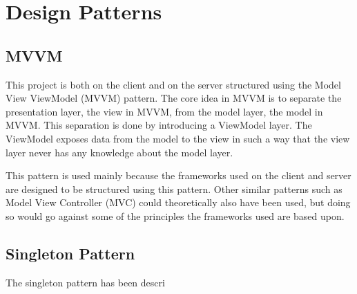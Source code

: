 \chapter{Design Patterns}

\section{MVVM}

This project is both on the client and on the server structured using
the Model View ViewModel (MVVM) pattern. The core idea in MVVM is to separate
the presentation layer, the view in MVVM, from the model layer, the
model in MVVM. This separation is done by introducing a ViewModel
layer. The ViewModel exposes data from the model to the view in such a
way that the view layer never has any knowledge about the model layer.

This pattern is used mainly because the frameworks used on the client
and server are designed to be structured using this pattern. Other
similar patterns such as Model View Controller (MVC) could
theoretically also have been used, but doing so would go against
some of the principles the frameworks used are based upon.

\section{Singleton Pattern}

The singleton pattern has been descri
